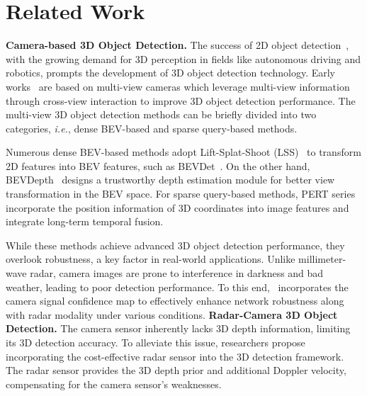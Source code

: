 \section{Related Work}
\label{sec:related_work}
%
{\flushleft \textbf{Camera-based 3D Object Detection.}}  
The success of 2D object detection~\citep{2d1,2d2}, with the growing demand for 3D perception in fields like autonomous driving and robotics, prompts the development of 3D object detection technology. 
Early works~\citep{bevdepth, bevdet, bevdet4d} are based on multi-view cameras which leverage multi-view information through cross-view interaction to improve 3D object detection performance. 
%
The multi-view 3D object detection methods can be briefly divided into two categories, \textit{i.e.}, dense BEV-based and sparse query-based methods. 

Numerous dense BEV-based methods adopt Lift-Splat-Shoot (LSS)~\citep{lss} to transform 2D features into BEV features, such as BEVDet~\citep{bevdet}. 
%
On the other hand, BEVDepth~\citep{bevdepth} designs a trustworthy depth estimation module for better view transformation in the BEV space. 
%
For sparse query-based methods, 
%
PERT series~\citep{petr, petrv2, focalpert, streampert} incorporate the position information of 3D coordinates into image features and integrate long-term temporal fusion.


While these methods achieve advanced 3D object detection performance, they overlook robustness, a key factor in real-world applications. Unlike millimeter-wave radar, camera images are prone to interference in darkness and bad weather, leading to poor detection performance.
%
To this end, \modelname~incorporates the camera signal confidence map to effectively enhance network robustness along with radar modality under various conditions.
{\flushleft \textbf{Radar-Camera 3D Object Detection.}}  
The camera sensor inherently lacks 3D depth information, limiting its 3D detection accuracy. 
%
To alleviate this issue, researchers propose incorporating the cost-effective radar sensor into the 3D detection framework.
%
The radar sensor provides the 3D depth prior and additional Doppler velocity, compensating for the camera sensor's weaknesses. 

